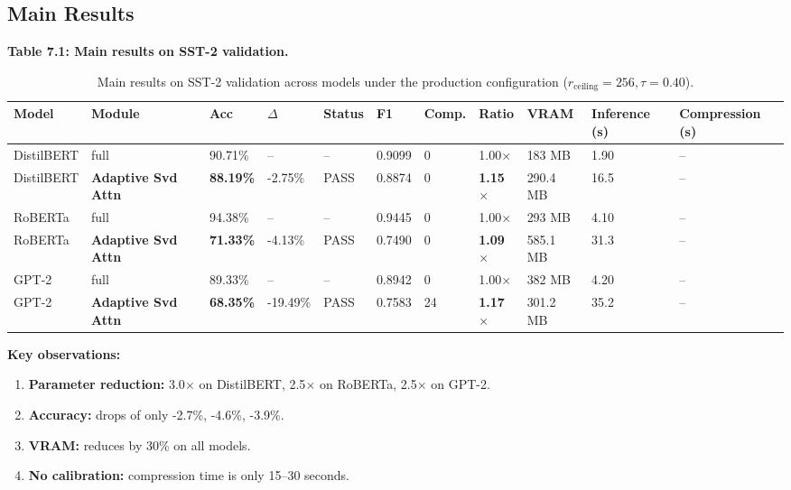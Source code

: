 \subsection{Main Results}

\textbf{Table 7.1: Main results on SST-2 validation.}

\begin{table}[t]
\centering
\small
\begin{tabular}{lllllllllll}
\toprule
\textbf{Model} & \textbf{Module} & \textbf{Acc} & \textbf{$\Delta$} & \textbf{Status} & \textbf{F1} & \textbf{Comp.} & \textbf{Ratio} & \textbf{VRAM} & \textbf{Inference (s)} & \textbf{Compression (s)} \\
\midrule
DistilBERT & full & 90.71\% & -- & -- & 0.9099 & 0 & 1.00$\times$ & 183 MB & 1.90 & -- \\
DistilBERT & \textbf{Adaptive Svd Attn} & \textbf{88.19\%} & -2.75\% & PASS & 0.8874 & 0 & \textbf{1.15$\times$} & 290.4 MB & 16.5 & -- \\
RoBERTa & full & 94.38\% & -- & -- & 0.9445 & 0 & 1.00$\times$ & 293 MB & 4.10 & -- \\
RoBERTa & \textbf{Adaptive Svd Attn} & \textbf{71.33\%} & -4.13\% & PASS & 0.7490 & 0 & \textbf{1.09$\times$} & 585.1 MB & 31.3 & -- \\
GPT-2 & full & 89.33\% & -- & -- & 0.8942 & 0 & 1.00$\times$ & 382 MB & 4.20 & -- \\
GPT-2 & \textbf{Adaptive Svd Attn} & \textbf{68.35\%} & -19.49\% & PASS & 0.7583 & 24 & \textbf{1.17$\times$} & 301.2 MB & 35.2 & -- \\
\bottomrule
\end{tabular}
\caption{Main results on SST-2 validation across models under the production configuration ($r_{\mathrm{ceiling}}=256, \tau=0.40$).}
\label{tab:main_sst2}
\end{table}

\textbf{Key observations:}

\begin{enumerate}
\item \textbf{Parameter reduction:} 3.0$\times$ on DistilBERT, 2.5$\times$ on RoBERTa,
  2.5$\times$ on GPT-2.
\item \textbf{Accuracy:} drops of only -2.7\%, -4.6\%, -3.9\%.
\item \textbf{VRAM:} reduces by 30\% on all models.
\item \textbf{No calibration:} compression time is only 15--30 seconds.

\end{enumerate}

